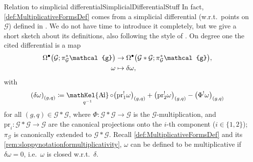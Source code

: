 \documentclass[reqno,a4paper,oneside]{amsart}
\theoremstyle{plain}
\theoremstyle{remark}
\theoremstyle{definition}
\DeclareMathOperator{\sAd}{\mathKel{A\mkern-5.5mu d}}
\begin{document}
\begin{remarks}{Relation to simplicial differential}{SimplicialDifferentialStuff}
In fact, \ref{def:MultiplicativeFormsDef} comes from a simplicial differential (w.r.t.\ points on $\mathcal{G}$) defined in \cite[beginning of \S 1.2]{crainic2003differentiable}. We do not have time to introduce it completely, but we give a short sketch about its definitions, also following the style of \cite[appendix]{FernandesMarcutMultiplicativeForms}. On degree one the cited differential is a map
\begin{align*}
\Omega^\bullet\mleft(\mathcal{G}; \pi_{\mathcal{G}}^*\mathcal{g}\mright)
&\to
\Omega^\bullet\mleft(\mathcal{G} * \mathcal{G}; \pi_{\mathcal{G}}^*\mathcal{g}\mright),
\\
\omega
&\mapsto
\delta\omega,
\end{align*}
with
\begin{equation*}
\mleft(\delta\omega\mright)_{(g,q)}
\coloneqq
\sAd_{q^{-1}}\circ\mleft(\mathrm{pr}_1^!\omega\mright)_{(g,q)} 
	+ \mleft(\mathrm{pr}_2^!\omega\mright)_{(g, q)}
	- \mleft( \Phi^!\omega \mright)_{(g,q)}
\end{equation*}
for all $(g, q) \in \mathcal{G} * \mathcal{G}$, where $\Phi: \mathcal{G}*\mathcal{G}\to \mathcal{G}$ is the $\mathcal{G}$-multiplication, and $\mathrm{pr}_i\colon \mathcal{G}*\mathcal{G} \to \mathcal{G}$ are the canonical projections onto the $i$-th component ($i \in \{1,2\}$); $\pi_{\mathcal{G}}$ is canonically extended to $\mathcal{G} * \mathcal{G}$. Recall \ref{def:MultiplicativeFormsDef} and its \ref{rem:sloppynotationformultiplicativity}, $\omega$ can be defined to be multiplicative if $\delta\omega = 0$, i.e.\ $\omega$ is closed w.r.t.\ $\delta$. 


\end{remarks}
\end{document}
